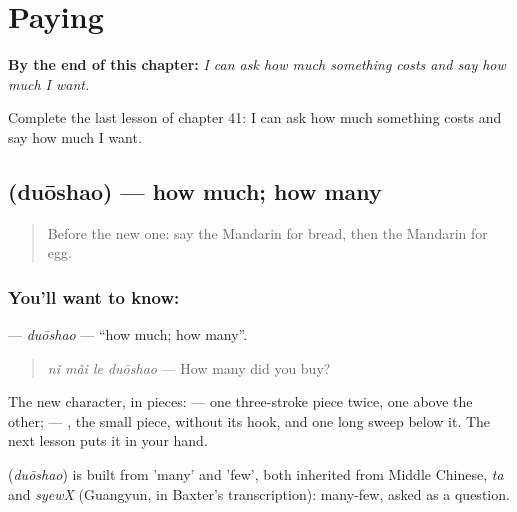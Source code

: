 
\chapter{Paying}
\label{ch:zh-paying}

\begin{chapteropening}
\textbf{By the end of this chapter:} \emph{I can ask how much something costs and say how much I want.}

Complete the last lesson of chapter 41: I can ask how much something costs and say how much I want.
\end{chapteropening}

\section[\texorpdfstring{\zh{多少} (duōshao)}{多少 (duōshao)}]{ (duōshao) — how much; how many}

\label{lesson:ZH-C41-duoshao}



\begin{quote}
Before the new one: say the Mandarin for bread, then the Mandarin for egg.
\end{quote}

\subsection*{You'll want to know: }
\textbf{} — \emph{duōshao} — \textquotedblleft{}how much; how many\textquotedblright{}.

\begin{quote}
\textbf{} \emph{nǐ mǎi le duōshao} — How many did you buy?
\end{quote}

The new character, in pieces:  — one three-stroke piece twice, one above the other;  — , the small piece, without its hook, and one long sweep below it. The next lesson puts it in your hand.

\begin{cousinweb}
\textbf{} (\emph{duōshao}) is built from  'many' and  'few', both inherited from Middle Chinese, \emph{ta} and \emph{syewX} (Guangyun, in Baxter's transcription): many-few, asked as a question.
\end{cousinweb}

